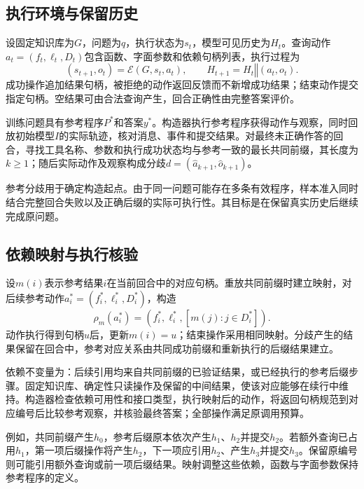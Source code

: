 \subsection{执行环境与保留历史}

设固定知识库为$G$，问题为$q$，执行状态为$s_t$，模型可见历史为$H_t$。查询动作$a_t=(f_t,\ell_t,D_t)$包含函数、字面参数和依赖句柄列表，执行过程为
\begin{equation}
 (s_{t+1},o_t)=\mathcal E(G,s_t,a_t),\qquad
 H_{t+1}=H_t\mathbin{\Vert}(a_t,o_t).
\end{equation}
成功操作追加结果句柄，被拒绝的动作返回反馈而不新增成功结果；结束动作提交指定句柄。空结果可由合法查询产生，回合正确性由完整答案评价。

训练问题具有参考程序$P^*$和答案$y^*$。构造器执行参考程序获得动作与观察，同时回放初始模型$I$的实际轨迹，核对消息、事件和提交结果。对最终未正确作答的回合，寻找工具名称、参数和执行成功状态均与参考一致的最长共同前缀，其长度为$k\geq1$；随后实际动作及观察构成分歧$d=(\hat a_{k+1},\hat o_{k+1})$。

参考分歧用于确定构造起点。由于同一问题可能存在多条有效程序，样本准入同时结合完整回合失败以及正确后缀的实际可执行性。其目标是在保留真实历史后继续完成原问题。

\subsection{依赖映射与执行核验}

设$m(i)$表示参考结果$i$在当前回合中的对应句柄。重放共同前缀时建立映射，对后续参考动作$a_i^*=(f_i^*,\ell_i^*,D_i^*)$，构造
\begin{equation}
 \rho_m(a_i^*)=
 \left(f_i^*,\ell_i^*,[m(j):j\in D_i^*]\right).
 \label{eq:remap-zh}
\end{equation}
动作执行得到句柄$u$后，更新$m(i)=u$；结束操作采用相同映射。分歧产生的结果保留在回合中，参考对应关系由共同成功前缀和重新执行的后缀结果建立。

依赖不变量为：后续引用均来自共同前缀的已验证结果，或已经执行的参考后缀步骤。固定知识库、确定性只读操作及保留的中间结果，使该对应能够在续行中维持。构造器检查依赖可用性和接口类型，执行映射后的动作，将返回句柄规范到对应编号后比较参考观察，并核验最终答案；全部操作满足原调用预算。

例如，共同前缀产生$h_0$，参考后缀原本依次产生$h_1$、$h_2$并提交$h_2$。若额外查询已占用$h_1$，第一项后缀操作将产生$h_2$，下一项应引用$h_2$、产生$h_3$并提交$h_3$。保留原编号则可能引用额外查询或前一项后缀结果。映射调整这些依赖，函数与字面参数保持参考程序的定义。

